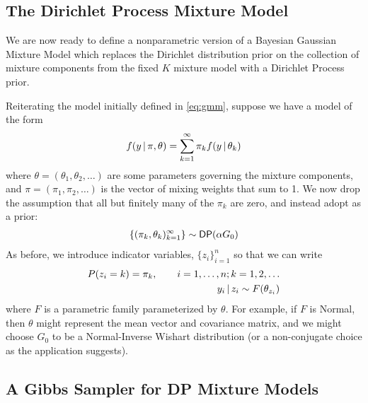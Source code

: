  \subsection{The Dirichlet Process Mixture Model}

  We are now ready to define a nonparametric version of a Bayesian
  Gaussian Mixture Model which replaces the Dirichlet distribution
  prior on the collection of mixture components from the fixed $K$ mixture model 
  with a Dirichlet Process prior.

  Reiterating the model initially defined in \eqref{eq:gmm}, suppose
  we have a model of the form
  \begin{equation}
    \label{eq:gmm-2}
    f(y \, \vert \, \pi, \theta) = \sum_{k=1}^\infty \pi_k f(y \, \vert \, \theta_k)
  \end{equation}
  where $\theta = (\theta_1, \theta_2, \dots)$ are some parameters
  governing the mixture components, and $\pi = (\pi_1, \pi_2, \dots)$ is
  the vector of mixing weights that sum to 1.  We now drop the
  assumption that all but finitely many of the $\pi_k$ are zero, and
  instead adopt as a prior:
  \begin{align}
    \label{eq:DP-prior}
    \{(\pi_k, \theta_k)_{k=1}^\infty\} \sim \mathsf{DP}(\alpha G_0)
  \end{align}
  As before, we introduce indicator variables, $\{z_i\}_{i=1}^n$ so
  that we can write
  \begin{align}
    \label{eq:5}
    P(z_i = k) = \pi_k, \qquad i = 1, \dots, n; k = 1, 2, \dots \\
    y_i \, \vert \, z_i \sim F(\theta_{z_i})
  \end{align}
  where $F$ is a parametric family parameterized by $\theta$. For
  example, if $F$ is Normal, then $\theta$ might represent the mean
  vector and covariance matrix, and we might choose $G_0$ to be a
  Normal-Inverse Wishart distribution (or a non-conjugate choice as
  the application suggests).

  \subsection{A Gibbs Sampler for DP Mixture Models}
  \label{sec:gibbs-sampler-dp}

